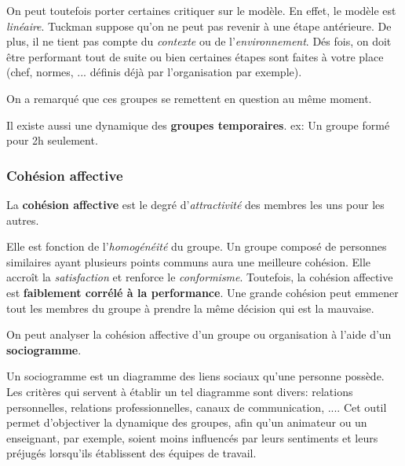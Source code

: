 \documentclass[12pt]{article}
\begin{document}
		On peut toutefois porter certaines critiquer sur le modèle. En effet, le modèle est \textit{linéaire}. Tuckman suppose qu'on ne peut pas revenir à une étape antérieure. De plus, il ne tient pas compte du \textit{contexte} ou de l'\textit{environnement}. Dés fois, on doit être performant tout de suite ou bien certaines étapes sont faites à votre place (chef, normes, ... définis déjà par l'organisation par exemple). \newline
		
		On a remarqué que ces groupes se remettent en question au même moment.\newline
		
		Il existe aussi une dynamique des \textbf{groupes temporaires}.\newline
		ex: Un groupe formé pour 2h seulement. \newline
		
				
		\subsubsection{Cohésion affective}
		
		La \textbf{cohésion affective} est le degré d'\textit{attractivité} des membres les uns pour les autres.	\newline
		
		Elle est fonction de l'\textit{homogénéité} du groupe. Un groupe composé de personnes similaires ayant plusieurs points communs aura une meilleure cohésion. Elle accroît la \textit{satisfaction} et renforce le \textit{conformisme}. Toutefois, la cohésion affective est \textbf{faiblement corrélé à la performance}. Une grande cohésion peut emmener tout les membres du groupe à prendre la même décision qui est la mauvaise. \newline
		
		On peut analyser la cohésion affective d'un groupe ou organisation à l'aide d'un \textbf{sociogramme}. \newline 
		
		Un sociogramme est un diagramme des liens sociaux qu'une personne possède. Les critères qui servent à établir un tel diagramme sont divers: relations personnelles, relations professionnelles, canaux de communication, .... Cet outil permet d'objectiver la dynamique des groupes, afin qu'un animateur ou un enseignant, par exemple, soient moins influencés par leurs sentiments et leurs préjugés lorsqu'ils établissent des équipes de travail.\newline
		
\end{document}
